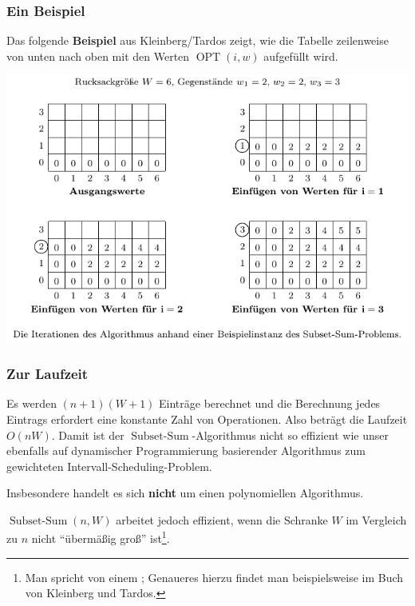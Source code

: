\documentclass[smaller]{beamer}
\DeclareMathOperator{\opt}{OPT}
\DeclareMathOperator{\ssum}{Subset-Sum}
\begin{document}
\begin{frame}
 \frametitle{Ein Beispiel}
 Das folgende \textbf{Beispiel} aus Kleinberg/Tardos zeigt, wie die Tabelle zeilenweise von unten nach oben mit den Werten $\opt{(i,w)}$ aufgefüllt wird.
\begin{center}
 \includegraphics[scale=0.8]{fig94.pdf}
\end{center}
\end{frame}

\begin{frame}
 \frametitle{Zur Laufzeit}
 Es werden $(n+1)(W+1)$ Einträge berechnet und die Berechnung jedes Eintrags erfordert eine konstante Zahl von Operationen. Also beträgt die Laufzeit $O(nW)$. \alert{Damit ist der $\ssum$-Algorithmus nicht so effizient wie unser ebenfalls auf dynamischer Programmierung basierender Algorithmus zum gewichteten Intervall-Scheduling-Problem.} \\ \medskip
 
 Insbesondere handelt es sich \alert{\textbf{nicht} um einen polynomiellen Algorithmus.} \\ \medskip
 
 
$\ssum{(n,W)}$ arbeitet jedoch effizient, wenn die Schranke $W$ im Vergleich zu $n$ nicht \enquote{übermäßig groß} ist\footnote{Man spricht von einem ; Genaueres hierzu findet man beispielsweise im Buch von Kleinberg und Tardos.}.
\end{frame}
\end{document}

